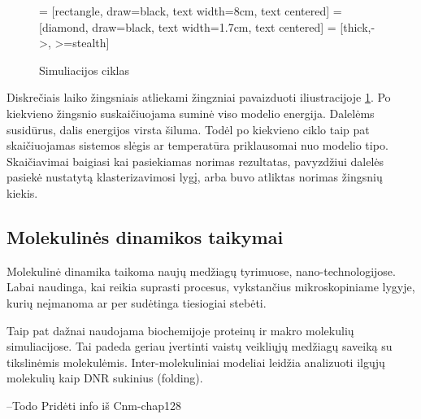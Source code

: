 \begin{figure}
\centering

\usetikzlibrary{shapes.geometric, arrows, arrows.meta, positioning, calc}
 = [rectangle, draw=black, text width=8cm, text centered]
 = [diamond, draw=black, text width=1.7cm, text centered]
 = [thick,->, >=stealth]


\caption[Simuliacijos ciklas] {Simuliacijos ciklas}
\label{fig:steps}
\end{figure}

Diskrečiais laiko žingsniais atliekami žingzniai pavaizduoti iliustracijoje \ref{fig:steps}.
Po kiekvieno žingsnio suskaičiuojama suminė viso modelio energija.
Dalelėms susidūrus, dalis energijos virsta šiluma.
Todėl po kiekvieno ciklo taip pat skaičiuojamas sistemos slėgis ar temperatūra priklausomai nuo modelio tipo.
Skaičiavimai baigiasi kai pasiekiamas norimas rezultatas, pavyzdžiui dalelės pasiekė nustatytą klasterizavimosi lygį,
arba buvo atliktas norimas žingsnių kiekis.


\subsection{Molekulinės dinamikos taikymai}
\label{sec:molecular_dynamics_applications}

Molekulinė dinamika taikoma naujų medžiagų tyrimuose, nano-technologijose.
Labai naudinga, kai reikia suprasti procesus, vykstančius mikroskopiniame lygyje, kurių neįmanoma ar per sudėtinga tiesiogiai stebėti.

Taip pat dažnai naudojama biochemijoje proteinų ir makro molekulių simuliacijose.
Tai padeda geriau įvertinti vaistų veikliųjų medžiagų saveiką su tikslinėmis molekulėmis.
Inter-molekuliniai modeliai leidžia analizuoti ilgųjų molekulių kaip DNR sukinius (folding).

--Todo
Pridėti info iš Cnm-chap128

